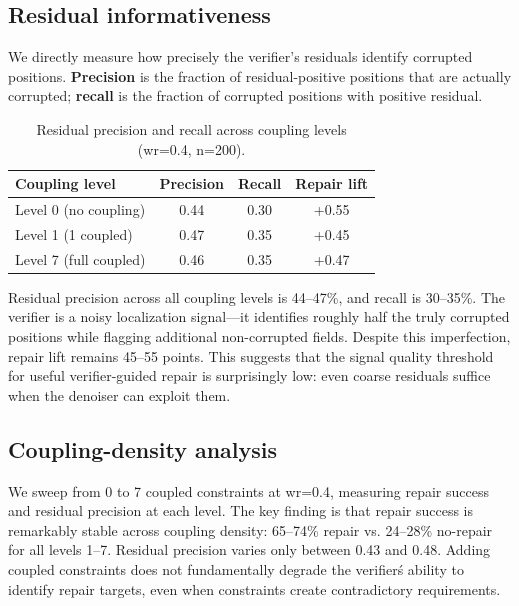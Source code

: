 \documentclass[11pt,a4paper,twoside]{article}
\theoremstyle{definition}
\begin{document}
\subsection{Residual informativeness}
\label{sec:residual}

We directly measure how precisely the verifier's residuals identify corrupted positions. \textbf{Precision} is the fraction of residual-positive positions that are actually corrupted; \textbf{recall} is the fraction of corrupted positions with positive residual.

\begin{table}[ht]
\centering
\caption{Residual precision and recall across coupling levels (wr=0.4, n=200).}
\label{tab:residual}
\begin{tabular}{lccc}
\toprule
Coupling level & Precision & Recall & Repair lift \\
\midrule
Level 0 (no coupling) & 0.44 & 0.30 & +0.55 \\
Level 1 (1 coupled) & 0.47 & 0.35 & +0.45 \\
Level 7 (full coupled) & 0.46 & 0.35 & +0.47 \\
\bottomrule
\end{tabular}
\end{table}

Residual precision across all coupling levels is 44--47\%, and recall is 30--35\%. The verifier is a noisy localization signal---it identifies roughly half the truly corrupted positions while flagging additional non-corrupted fields. Despite this imperfection, repair lift remains 45--55 points. This suggests that the signal quality threshold for useful verifier-guided repair is surprisingly low: even coarse residuals suffice when the denoiser can exploit them.

\subsection{Coupling-density analysis}
\label{sec:coupling}

We sweep from 0 to 7 coupled constraints at wr=0.4, measuring repair success and residual precision at each level. The key finding is that repair success is remarkably stable across coupling density: 65--74\% repair vs. 24--28\% no-repair for all levels 1--7. Residual precision varies only between 0.43 and 0.48. Adding coupled constraints does not fundamentally degrade the verifier\'s ability to identify repair targets, even when constraints create contradictory requirements.
\end{document}
